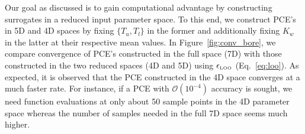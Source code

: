 Our goal as discussed is to gain computational advantage by constructing surrogates in a 
reduced input parameter space. To this end, we construct PCE's in 5D and 4D spaces by
fixing $\{T_u,T_l\}$ in the former and additionally fixing $K_w$ in the latter at their respective
mean values. In Figure~\ref{fig:conv_bore}, we compare convergence of PCE's constructed
in the full space (7D) with those constructed in the two reduced spaces (4D and 5D) using
$\epsilon_{\mbox{\tiny{LOO}}}$ (Eq.~\ref{eq:loo}). As expected, it is observed that the PCE
constructed in the 4D space converges at a much faster rate. For instance, if a PCE with
$\mathcal{O}(10^{-4})$ accuracy is sought, we need function evaluations at only about
50 sample points in the 4D parameter space whereas the number of samples needed in the full 
7D space seems much higher. 






































